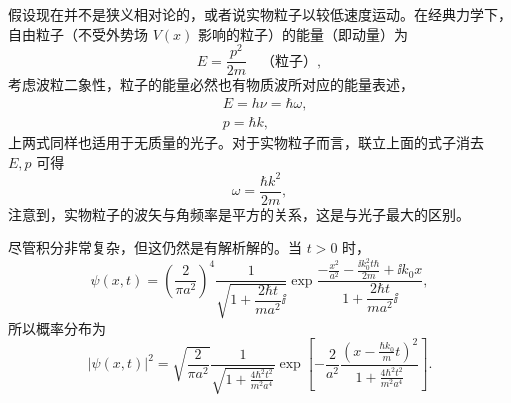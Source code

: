 假设现在并不是狭义相对论的，或者说实物粒子以较低速度运动。在经典力学下，自由粒子（不受外势场 $V (x)$ 影响的粒子）的能量（即动量）为
\begin{equation}
    E = \frac{p^2}{2m} \quad \text{（粒子）},
\end{equation}
考虑波粒二象性，粒子的能量必然也有物质波所对应的能量表述，
\begin{align}
    &E = h\nu = \hbar \omega, \\
    &p = \hbar k, 
\end{align}
上两式同样也适用于无质量的光子。对于实物粒子而言，联立上面的式子消去 $E,p$ 可得
\begin{equation}
    \omega = \frac{\hbar k^2}{2m},
\end{equation}
注意到，实物粒子的波矢与角频率是平方的关系，这是与光子最大的区别。


尽管积分非常复杂，但这仍然是有解析解的。当 $t > 0$ 时，
\begin{equation}
    \psi(x,t) = \left(\frac{2}{\pi a^2}\right)^4 \frac1 {\sqrt{ 1 + \dfrac{2\hbar t}{ma^2}\ii}} \exp \frac {\displaystyle -\frac{x^2}{a^2}-\frac{\ii k_0^2 t \hbar }{2 m}+\ii
    k_0 x} {1 + \dfrac{2\hbar t}{ma^2}\ii},
\end{equation}
所以概率分布为
\begin{equation}
    |\psi(x, t)|^2 = \sqrt{\frac{2}{\pi a^2}} \frac{1}{\sqrt{1 + \displaystyle \frac{4 \hbar^2 t^2}{m^2 a^4}}} \exp \left[ - \frac{2}{a^2} \frac{\left( x - \displaystyle \frac{\hbar k_0}{m} t \right)^2}{1 + \displaystyle \frac{4 \hbar^2 t^2}{m^2 a^4}} \right]. 
\end{equation}


